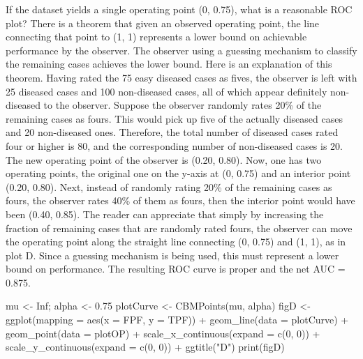 \documentclass[
]{book}
\newenvironment{Shaded}{\begin{snugshade}}{\end{snugshade}}
\newcommand{\AttributeTok}[1]{\textcolor[rgb]{0.77,0.63,0.00}{#1}}
\newcommand{\ConstantTok}[1]{\textcolor[rgb]{0.00,0.00,0.00}{#1}}
\newcommand{\DecValTok}[1]{\textcolor[rgb]{0.00,0.00,0.81}{#1}}
\newcommand{\FloatTok}[1]{\textcolor[rgb]{0.00,0.00,0.81}{#1}}
\newcommand{\FunctionTok}[1]{\textcolor[rgb]{0.00,0.00,0.00}{#1}}
\newcommand{\NormalTok}[1]{#1}
\newcommand{\OtherTok}[1]{\textcolor[rgb]{0.56,0.35,0.01}{#1}}
\newcommand{\SpecialCharTok}[1]{\textcolor[rgb]{0.00,0.00,0.00}{#1}}
\newcommand{\StringTok}[1]{\textcolor[rgb]{0.31,0.60,0.02}{#1}}
\begin{document}
If the dataset yields a single operating point (0, 0.75), what is a reasonable ROC plot? There is a theorem that given an observed operating point, the line connecting that point to (1, 1) represents a lower bound on achievable performance by the observer. The observer using a guessing mechanism to classify the remaining cases achieves the lower bound. Here is an explanation of this theorem. Having rated the 75 easy diseased cases as fives, the observer is left with 25 diseased cases and 100 non-diseased cases, all of which appear definitely non-diseased to the observer. Suppose the observer randomly rates 20\% of the remaining cases as fours. This would pick up five of the actually diseased cases and 20 non-diseased ones. Therefore, the total number of diseased cases rated four or higher is 80, and the corresponding number of non-diseased cases is 20. The new operating point of the observer is (0.20, 0.80). Now, one has two operating points, the original one on the y-axis at (0, 0.75) and an interior point (0.20, 0.80). Next, instead of randomly rating 20\% of the remaining cases as fours, the observer rates 40\% of them as fours, then the interior point would have been (0.40, 0.85). The reader can appreciate that simply by increasing the fraction of remaining cases that are randomly rated fours, the observer can move the operating point along the straight line connecting (0, 0.75) and (1, 1), as in plot D. Since a guessing mechanism is being used, this must represent a lower bound on performance. The resulting ROC curve is proper and the net AUC = 0.875.

\begin{Shaded}
\begin{Highlighting}[]
\NormalTok{mu }\OtherTok{\textless{}{-}} \ConstantTok{Inf}\NormalTok{; alpha }\OtherTok{\textless{}{-}} \FloatTok{0.75}
\NormalTok{plotCurve }\OtherTok{\textless{}{-}} \FunctionTok{CBMPoints}\NormalTok{(mu, alpha)}
\NormalTok{figD }\OtherTok{\textless{}{-}} \FunctionTok{ggplot}\NormalTok{(}\AttributeTok{mapping =} \FunctionTok{aes}\NormalTok{(}\AttributeTok{x =}\NormalTok{ FPF, }\AttributeTok{y =}\NormalTok{ TPF)) }\SpecialCharTok{+} 
  \FunctionTok{geom\_line}\NormalTok{(}\AttributeTok{data =}\NormalTok{ plotCurve) }\SpecialCharTok{+} 
  \FunctionTok{geom\_point}\NormalTok{(}\AttributeTok{data =}\NormalTok{ plotOP)  }\SpecialCharTok{+} 
  \FunctionTok{scale\_x\_continuous}\NormalTok{(}\AttributeTok{expand =} \FunctionTok{c}\NormalTok{(}\DecValTok{0}\NormalTok{, }\DecValTok{0}\NormalTok{)) }\SpecialCharTok{+} 
  \FunctionTok{scale\_y\_continuous}\NormalTok{(}\AttributeTok{expand =} \FunctionTok{c}\NormalTok{(}\DecValTok{0}\NormalTok{, }\DecValTok{0}\NormalTok{)) }\SpecialCharTok{+}
  \FunctionTok{ggtitle}\NormalTok{(}\StringTok{"D"}\NormalTok{)}
\FunctionTok{print}\NormalTok{(figD)}
\end{Highlighting}
\end{Shaded}
\end{document}
